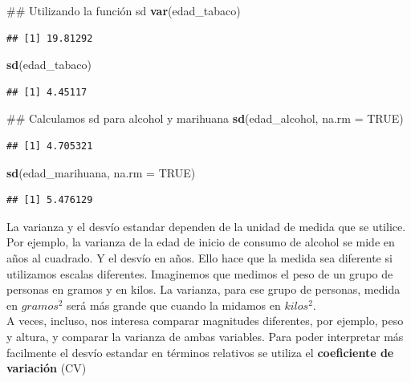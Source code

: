 \documentclass[spanish,]{book}
\newenvironment{Shaded}{\begin{snugshade}}{\end{snugshade}}
\newcommand{\KeywordTok}[1]{\textcolor[rgb]{0.13,0.29,0.53}{\textbf{#1}}}
\newcommand{\DataTypeTok}[1]{\textcolor[rgb]{0.13,0.29,0.53}{#1}}
\newcommand{\OtherTok}[1]{\textcolor[rgb]{0.56,0.35,0.01}{#1}}
\newcommand{\NormalTok}[1]{#1}
\begin{document}
\begin{Shaded}
\begin{Highlighting}[]
\NormalTok{## Utilizando la función sd}
\KeywordTok{var}\NormalTok{(edad_tabaco)}
\end{Highlighting}
\end{Shaded}

\begin{verbatim}
## [1] 19.81292
\end{verbatim}

\begin{Shaded}
\begin{Highlighting}[]
\KeywordTok{sd}\NormalTok{(edad_tabaco)}
\end{Highlighting}
\end{Shaded}

\begin{verbatim}
## [1] 4.45117
\end{verbatim}

\begin{Shaded}
\begin{Highlighting}[]
\NormalTok{## Calculamos sd para alcohol y marihuana}
\KeywordTok{sd}\NormalTok{(edad_alcohol, }\DataTypeTok{na.rm =} \OtherTok{TRUE}\NormalTok{)}
\end{Highlighting}
\end{Shaded}

\begin{verbatim}
## [1] 4.705321
\end{verbatim}

\begin{Shaded}
\begin{Highlighting}[]
\KeywordTok{sd}\NormalTok{(edad_marihuana, }\DataTypeTok{na.rm =} \OtherTok{TRUE}\NormalTok{)}
\end{Highlighting}
\end{Shaded}

\begin{verbatim}
## [1] 5.476129
\end{verbatim}

La varianza y el desvío estandar dependen de la unidad de medida que se
utilice. Por ejemplo, la varianza de la edad de inicio de consumo de
alcohol se mide en años al cuadrado. Y el desvío en años. Ello hace que
la medida sea diferente si utilizamos escalas diferentes. Imaginemos que
medimos el peso de un grupo de personas en gramos y en kilos. La
varianza, para ese grupo de personas, medida en \(gramos^2\) será más
grande que cuando la midamos en \(kilos^2\).\\
A veces, incluso, nos interesa comparar magnitudes diferentes, por
ejemplo, peso y altura, y comparar la varianza de ambas variables. Para
poder interpretar más facilmente el desvío estandar en términos
relativos se utiliza el \textbf{coeficiente de variación} (CV)
\end{document}
